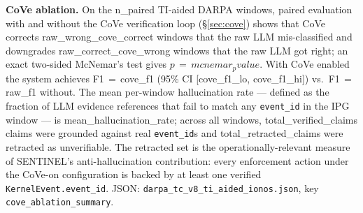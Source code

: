 
\noindent\textbf{CoVe ablation.}
On the {{n_paired}} TI-aided DARPA windows, paired evaluation with and without
the CoVe verification loop (\S\ref{sec:cove}) shows that CoVe corrects
{{raw_wrong_cove_correct}} windows that the raw LLM mis-classified and
downgrades {{raw_correct_cove_wrong}} windows that the raw LLM got right; an
exact two-sided McNemar's test gives $p\,=\,{{mcnemar_pvalue}}$.
With CoVe enabled the system achieves
F1\,$=$\,{{cove_f1}} (95\% CI [{{cove_f1_lo}}, {{cove_f1_hi}}]) vs.\
F1\,$=$\,{{raw_f1}} without. The mean per-window hallucination rate ---
defined as the fraction of LLM evidence references that fail to match any
\texttt{event\_id} in the IPG window --- is {{mean_hallucination_rate}};
across all windows, {{total_verified_claims}} claims were grounded against
real \texttt{event\_id}s and {{total_retracted_claims}} were retracted as
unverifiable. The retracted set is the operationally-relevant measure of
SENTINEL's anti-hallucination contribution: every enforcement action under
the CoVe-on configuration is backed by at least one verified
\texttt{KernelEvent.event\_id}.
JSON: \texttt{darpa\_tc\_v8\_ti\_aided\_ionos.json}, key
\texttt{cove\_ablation\_summary}.
